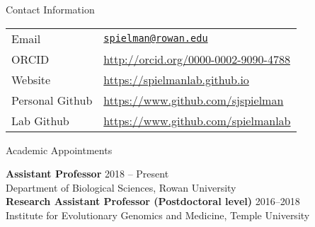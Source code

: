\documentclass{resume} %
\begin{document}
\vspace*{0.5cm}
\begin{rSection}{Contact Information}
\vspace*{0.25cm}

\begin{table}[H]
	\begin{tabular}{ll}
		Email & \texttt{\href{mailto:spielman@rowan.edu}{spielman@rowan.edu}} \\
		ORCID & \url{http://orcid.org/0000-0002-9090-4788} \\
		Website & \url{https://spielmanlab.github.io} \\
		Personal Github &  \url{https://www.github.com/sjspielman} \\
		Lab Github &  \url{https://www.github.com/spielmanlab} \\
	\end{tabular}
\end{table}
\end{rSection}
\vspace*{-0.45cm}



\begin{rSection}{Academic Appointments}
\vspace*{0.25cm}

{\bf Assistant Professor} \hfill {2018 -- Present} \\
Department of Biological Sciences, Rowan University \\


{\bf Research Assistant Professor (Postdoctoral level)} \hfill {2016--2018} \\
Institute for Evolutionary Genomics and Medicine, Temple University \\
\end{rSection}
\end{document}
